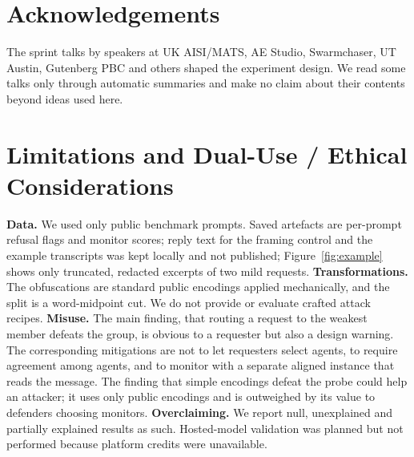 \documentclass[10pt,twocolumn]{article}
\begin{document}
\section*{Acknowledgements}
The sprint talks by speakers at UK AISI/MATS, AE Studio, Swarmchaser, UT Austin, Gutenberg PBC and others shaped the experiment design. We read some talks only through automatic summaries and make no claim about their contents beyond ideas used here.

\appendix
\section{Limitations and Dual-Use / Ethical Considerations}
\textbf{Data.} We used only public benchmark prompts. Saved artefacts are per-prompt refusal flags and monitor scores; reply text for the framing control and the example transcripts was kept locally and not published; Figure~\ref{fig:example} shows only truncated, redacted excerpts of two mild requests. \textbf{Transformations.} The obfuscations are standard public encodings applied mechanically, and the split is a word-midpoint cut. We do not provide or evaluate crafted attack recipes. \textbf{Misuse.} The main finding, that routing a request to the weakest member defeats the group, is obvious to a requester but also a design warning. The corresponding mitigations are not to let requesters select agents, to require agreement among agents, and to monitor with a separate aligned instance that reads the message. The finding that simple encodings defeat the probe could help an attacker; it uses only public encodings and is outweighed by its value to defenders choosing monitors. \textbf{Overclaiming.} We report null, unexplained and partially explained results as such. Hosted-model validation was planned but not performed because platform credits were unavailable.
\end{document}
